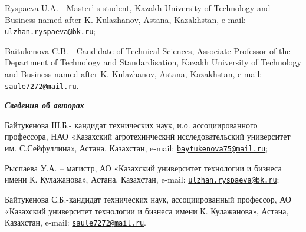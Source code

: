 Ryspaeva U.A. - Master' s student, Kazakh University of
Technology and Business named after K. Kulazhanov, Astana, Kazakhstan,
e-mail:
\href{mailto:ulzhan.ryspaeva@bk.ru}{\nolinkurl{ulzhan.ryspaeva@bk.ru}};

Baitukenova C.B. - Candidate of Technical Sciences, Associate Professor
of the Department of Technology and Standardisation, Kazakh University
of Technology and Business named after K. Kulazhanov, Astana,
Kazakhstan, e-mail:
\href{mailto:saule7272@mail.ru}{\nolinkurl{saule7272@mail.ru}}.

\emph{{\bfseries Сведения об авторах}}

Байтукенова Ш.Б.- кандидат технических наук, и.о. ассоциированного
профессора, НАО «Казахский агротехнический исследовательский университет
им. С.Сейфуллина», Астана, Казахстан, e-mail:
\href{mailto:baytukenova75@mail.ru}{\nolinkurl{baytukenova75@mail.ru}};

Рыспаева У.А. -- магистр, АО «Казахский университет технологии и бизнеса
имени К. Кулажанова», Астана, Казахстан, e-mail:
\href{mailto:ulzhan.ryspaeva@bk.ru}{\nolinkurl{ulzhan.ryspaeva@bk.ru}};

Байтукенова С.Б.-кандидат технических наук, ассоциированный профессор,
АО «Казахский университет технологии и бизнеса имени К. Кулажанова»,
Астана, Казахстан, e-mail:
\href{mailto:saule7272@mail.ru}{\nolinkurl{saule7272@mail.ru}}.